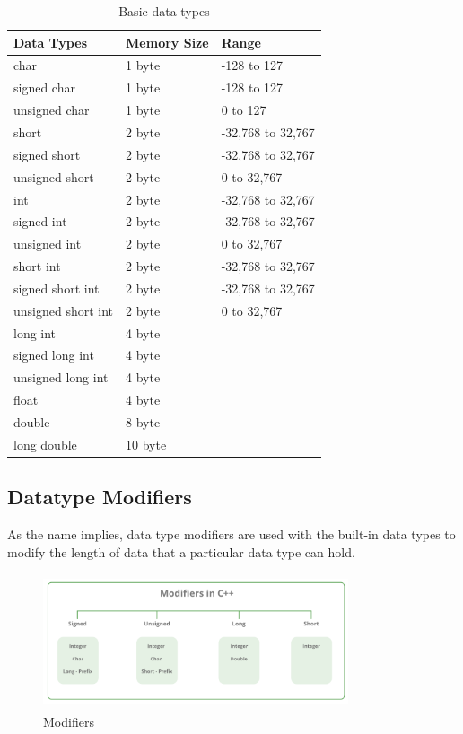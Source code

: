 \documentclass{book}
\begin{document}
\begin{table}[h]
\centering 
\begin{tabular}{lll} \hline 
Data Types	& Memory Size	& Range \\ \hline 
char	& 1 byte	& -128 to 127 \\
signed char	& 1 byte	& -128 to 127 \\
unsigned char	& 1 byte	& 0 to 127 \\
short	& 2 byte	& -32,768 to 32,767 \\
signed short	& 2 byte	& -32,768 to 32,767 \\
unsigned short	& 2 byte	& 0 to 32,767 \\
int	& 2 byte	& -32,768 to 32,767 \\
signed int	& 2 byte	& -32,768 to 32,767 \\
unsigned int	& 2 byte	& 0 to 32,767 \\
short int	& 2 byte	& -32,768 to 32,767 \\
signed short int	& 2 byte	& -32,768 to 32,767 \\
unsigned short int	& 2 byte	& 0 to 32,767 \\
long int	& 4 byte & \\
signed long int	& 4 byte & \\
unsigned long int	& 4 byte & \\
float	& 4 byte & \\ 
double	& 8 byte & \\
long double	& 10 byte & \\ \hline 
\end{tabular}
\caption{Basic data types}
\label{datatypes}
\end{table}

\subsection{Datatype Modifiers}

As the name implies, data type modifiers are used with the built-in data types to modify the length of data that a particular data type can hold. 

\begin{figure}[h]
\centering
\includegraphics[width=9cm, height=4cm]{modifiers}%
\caption{Modifiers}%
\label{}%
\end{figure}
\end{document}
